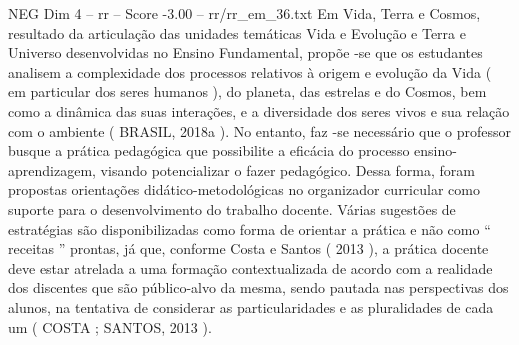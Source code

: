 \begin{textsample}{NEG Dim 4 – rr – Score -3.00 – rr/rr\_em\_36.txt}
Em Vida, Terra e Cosmos, resultado da articulação das unidades temáticas Vida e Evolução e Terra e Universo desenvolvidas no Ensino Fundamental, propõe -se que os estudantes analisem a complexidade dos processos relativos à origem e evolução da Vida ( em particular dos seres humanos ), do planeta, das estrelas e do Cosmos, bem como a dinâmica das suas interações, e a diversidade dos seres vivos e sua relação com o ambiente ( BRASIL, 2018a ).
No entanto, faz -se necessário que o professor busque a prática pedagógica que possibilite a eficácia do processo ensino-aprendizagem, visando potencializar o fazer pedagógico.
Dessa forma, foram propostas orientações didático-metodológicas no organizador curricular como suporte para o desenvolvimento do trabalho docente.
Várias sugestões de estratégias são disponibilizadas como forma de orientar a prática e não como “ receitas ” prontas, já que, conforme Costa e Santos ( 2013 ), a prática docente deve estar atrelada a uma formação contextualizada de acordo com a realidade dos discentes que são público-alvo da mesma, sendo pautada nas perspectivas dos alunos, na tentativa de considerar as particularidades e as pluralidades de cada um ( COSTA ; SANTOS, 2013 ).

\end{textsample}
